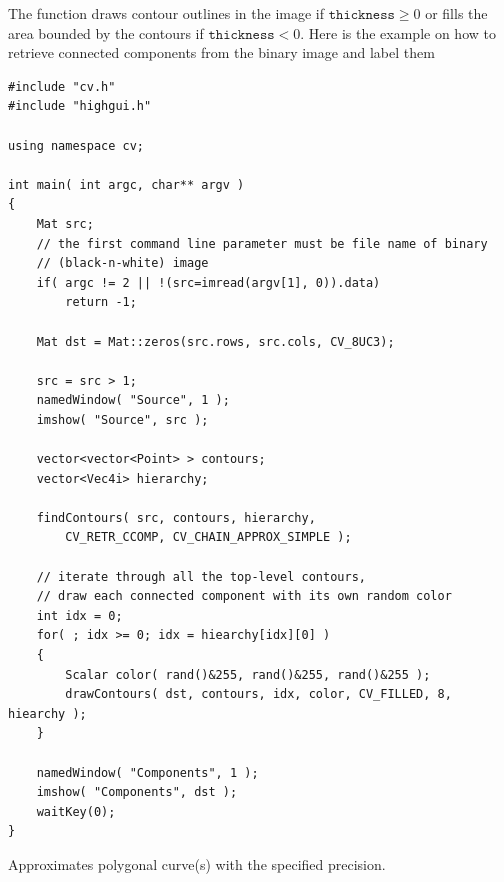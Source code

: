 The function draws contour outlines in the image if $\texttt{thickness} \ge 0$ or fills the area bounded by the contours if $ \texttt{thickness}<0$. Here is the example on how to retrieve connected components from the binary image and label them

\begin{lstlisting}
#include "cv.h"
#include "highgui.h"

using namespace cv;

int main( int argc, char** argv )
{
    Mat src;
    // the first command line parameter must be file name of binary 
    // (black-n-white) image
    if( argc != 2 || !(src=imread(argv[1], 0)).data)
        return -1;

    Mat dst = Mat::zeros(src.rows, src.cols, CV_8UC3);

    src = src > 1;
    namedWindow( "Source", 1 );
    imshow( "Source", src );

    vector<vector<Point> > contours;
    vector<Vec4i> hierarchy;
    
    findContours( src, contours, hierarchy, 
        CV_RETR_CCOMP, CV_CHAIN_APPROX_SIMPLE );

    // iterate through all the top-level contours,
    // draw each connected component with its own random color
    int idx = 0;
    for( ; idx >= 0; idx = hiearchy[idx][0] )
    {
        Scalar color( rand()&255, rand()&255, rand()&255 );
        drawContours( dst, contours, idx, color, CV_FILLED, 8, hiearchy );
    }

    namedWindow( "Components", 1 );
    imshow( "Components", dst );
    waitKey(0);
}
\end{lstlisting}


Approximates polygonal curve(s) with the specified precision.

\begin{description}
\end{description}

